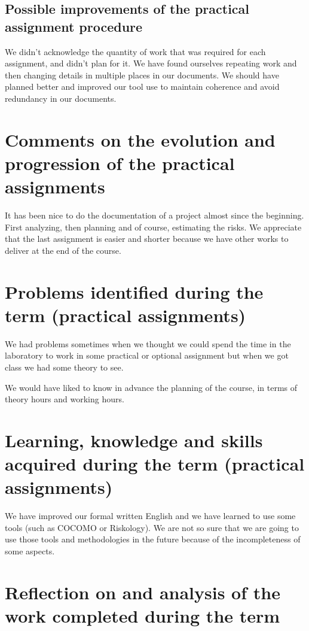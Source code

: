 \documentclass{report}
\begin{document}
\subsection{Possible improvements of the practical assignment procedure}

We didn't acknowledge the quantity of work that was required for each assignment, and didn't plan for it. We have found ourselves repeating work and then changing details in multiple places in our documents. We should have planned better and improved our tool use to maintain coherence and avoid redundancy in our documents.

\section{Comments on the evolution and progression of the practical assignments}

It has been nice to do the documentation of a project almost since the beginning. First analyzing, then planning and of course, estimating the risks. We appreciate that the last assignment is easier and shorter because we have other works to deliver at the end of the course.

\section{Problems identified during the term (practical assignments)}
We had problems sometimes when we thought we could spend the time in the laboratory to work in some practical or optional assignment but when we got class we had some theory to see.

We would have liked to know in advance the planning of the course, in terms of theory hours and working hours.

\section{Learning, knowledge and skills acquired during the term (practical assignments)}

We have improved our formal written English and we have learned to use some tools (such as COCOMO or Riskology). We are not so sure that we are going to use those tools and methodologies in the future because of the incompleteness of some aspects.

\section{Reflection on and analysis of the work completed during the term}
\end{document}
